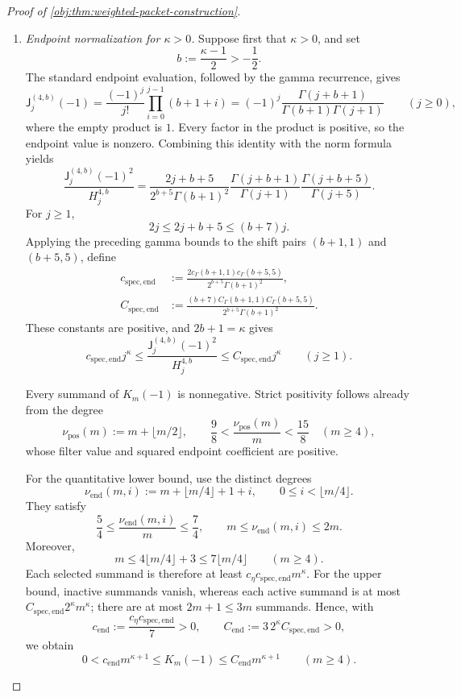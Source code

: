 \begin{proof}[Proof of \cref{obj:thm:weighted-packet-construction}]
\begin{enumerate}
\item \emph{Endpoint normalization for \(\kappa>0\).}
Suppose first that \(\kappa>0\), and set
\[
b:=\frac{\kappa-1}{2}>-\frac12.
\]
The standard endpoint evaluation, followed by the gamma recurrence, gives
\[
\mathsf J_j^{(4,b)}(-1)
=
\frac{(-1)^j}{j!}\prod_{i=0}^{j-1}(b+1+i)
=
(-1)^j\frac{\Gamma(j+b+1)}
{\Gamma(b+1)\Gamma(j+1)}
\qquad(j\ge0),
\]
where the empty product is \(1\). Every factor in the product is positive, so the endpoint value is nonzero. Combining this identity with the norm formula yields
\[
\frac{\mathsf J_j^{(4,b)}(-1)^2}{H_j^{4,b}}
=
\frac{2j+b+5}{2^{b+5}\Gamma(b+1)^2}
\frac{\Gamma(j+b+1)}{\Gamma(j+1)}
\frac{\Gamma(j+b+5)}{\Gamma(j+5)}.
\]
For \(j\ge1\),
\[
2j\le2j+b+5\le(b+7)j.
\]
Applying the preceding gamma bounds to the shift pairs
\((b+1,1)\) and \((b+5,5)\), define
\[
\begin{split}
c_{\mathrm{spec,end}}
&:=
\frac{2c_\Gamma(b+1,1)c_\Gamma(b+5,5)}
     {2^{b+5}\Gamma(b+1)^2},\\
C_{\mathrm{spec,end}}
&:=
\frac{(b+7)C_\Gamma(b+1,1)C_\Gamma(b+5,5)}
     {2^{b+5}\Gamma(b+1)^2}.
\end{split}
\]
These constants are positive, and \(2b+1=\kappa\) gives
\[
c_{\mathrm{spec,end}}j^\kappa
\le
\frac{\mathsf J_j^{(4,b)}(-1)^2}{H_j^{4,b}}
\le
C_{\mathrm{spec,end}}j^\kappa
\qquad(j\ge1).
\]

Every summand of \(K_m(-1)\) is nonnegative. Strict positivity follows already from the degree
\[
\nu_{\mathrm{pos}}(m):=m+\lfloor m/2\rfloor,
\qquad
\frac98<\frac{\nu_{\mathrm{pos}}(m)}m<\frac{15}8
\quad(m\ge4),
\]
whose filter value and squared endpoint coefficient are positive.

For the quantitative lower bound, use the distinct degrees
\[
\nu_{\mathrm{end}}(m,i)
:=
m+\lfloor m/4\rfloor+1+i,
\qquad
0\le i<\lfloor m/4\rfloor.
\]
They satisfy
\[
\frac54\le\frac{\nu_{\mathrm{end}}(m,i)}m\le\frac74,
\qquad
m\le\nu_{\mathrm{end}}(m,i)\le2m.
\]
Moreover,
\[
m\le4\lfloor m/4\rfloor+3
\le7\lfloor m/4\rfloor
\qquad(m\ge4).
\]
Each selected summand is therefore at least
\(c_\eta c_{\mathrm{spec,end}}m^\kappa\). For the upper bound, inactive summands vanish, whereas each active summand is at most
\(C_{\mathrm{spec,end}}2^\kappa m^\kappa\); there are at most \(2m+1\le3m\) summands. Hence, with
\[
c_{\mathrm{end}}
:=\frac{c_\eta c_{\mathrm{spec,end}}}{7}>0,
\qquad
C_{\mathrm{end}}
:=3\,2^\kappa C_{\mathrm{spec,end}}>0,
\]
we obtain
\[
0<c_{\mathrm{end}}m^{\kappa+1}
\le K_m(-1)\le C_{\mathrm{end}}m^{\kappa+1}
\qquad(m\ge4).
\]


\end{enumerate}
\end{proof}
